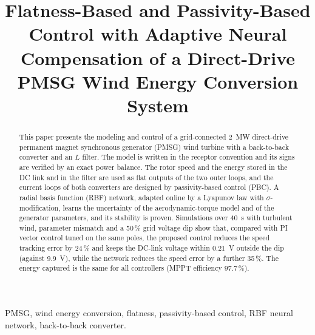 \documentclass[conference]{IEEEtran}
\begin{document}
\title{Flatness-Based and Passivity-Based Control with Adaptive Neural Compensation of a Direct-Drive PMSG Wind Energy Conversion System}

\author{
\and
{}
\and
{}
}

\maketitle

\begin{abstract}
This paper presents the modeling and control of a grid-connected 2~MW direct-drive permanent magnet
synchronous generator (PMSG) wind turbine with a back-to-back converter and an $L$ filter. The model is
written in the receptor convention and its signs are verified by an exact power balance. The rotor
speed and the energy stored in the DC link and in the filter are used as flat outputs of the two outer
loops, and the current loops of both converters are designed by passivity-based control (PBC). A radial
basis function (RBF) network, adapted online by a Lyapunov law with $\sigma$-modification, learns the
uncertainty of the aerodynamic-torque model and of the generator parameters, and its stability is
proven. Simulations over 40~s with turbulent wind, parameter mismatch and a 50\,\% grid voltage dip
show that, compared with PI vector control tuned on the same poles, the proposed control reduces the
speed tracking error by 24\,\% and keeps the DC-link voltage within
0.21~V outside the dip (against 9.9~V), while the network reduces the speed
error by a further 35\,\%. The energy captured is the same for all controllers
(MPPT efficiency 97.7\,\%).
\end{abstract}

\begin{IEEEkeywords}
PMSG, wind energy conversion, flatness, passivity-based control, RBF neural network, back-to-back converter.
\end{IEEEkeywords}
\end{document}
